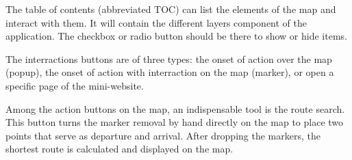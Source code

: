 
The table of contents (abbreviated TOC) can list the elements of the map and interact with them. It will contain the different layers component of the application. The checkbox or radio button should be there to show or hide items.

The interractions buttons are of three types: the onset of action over the map (popup), the onset of action with interraction on the map (marker), or open a specific page of the mini-website.



Among the action buttons on the map, an indispensable tool is the route search. This button turns the marker removal by hand directly on the map to place two points that serve as departure and arrival. After dropping the markers, the shortest route is calculated and displayed on the map.

